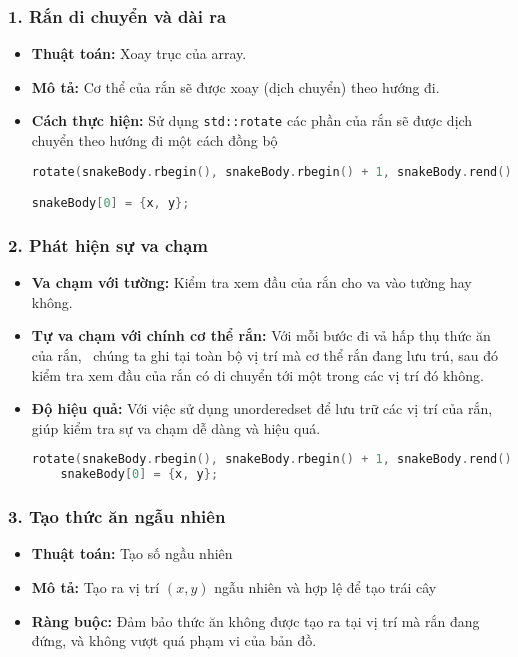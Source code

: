 \documentclass[12pt]{report}
\begin{document}
\subsubsection*{1. Rắn di chuyển và dài ra}
\begin{itemize}
    \item \textbf{Thuật toán:} Xoay trục của array.
    \item \textbf{Mô tả:} Cơ thể của rắn sẽ được xoay (dịch chuyển) theo hướng đi.
    \item \textbf{Cách thực hiện:} Sử dụng \texttt{std::rotate} các phần của rắn sẽ được dịch chuyển theo hướng đi một cách đồng bộ
          \begin{footnotesize}
              \begin{lstlisting}[language=C++]
rotate(snakeBody.rbegin(), snakeBody.rbegin() + 1, snakeBody.rend());

snakeBody[0] = {x, y};
    \end{lstlisting}
          \end{footnotesize}
\end{itemize}

\subsubsection*{2. Phát hiện sự va chạm}
\begin{itemize}
    \item \textbf{Va chạm với tường:} Kiểm tra xem đầu của rắn cho va vào tường hay không.
    \item \textbf{Tự va chạm với chính cơ thể rắn:} Với mỗi bước đi vả hấp thụ thức ăn của rắn, \
          chúng ta ghi tại toàn bộ vị trí mà cơ thể rắn đang lưu trú, sau đó kiểm tra xem đầu của rắn có di chuyển tới một trong các vị trí đó không.
    \item \textbf{Độ hiệu quả:} Với việc sử dụng unorderedset để lưu trữ các vị trí của rắn, giúp kiểm tra sự va chạm dễ dàng và hiệu quá.
          \begin{footnotesize}
              \begin{lstlisting}[language=C++]
    rotate(snakeBody.rbegin(), snakeBody.rbegin() + 1, snakeBody.rend());
    snakeBody[0] = {x, y};
  \end{lstlisting}
          \end{footnotesize}
\end{itemize}

\subsubsection*{3. Tạo thức ăn ngẫu nhiên}
\begin{itemize}
    \item \textbf{Thuật toán:} Tạo số ngầu nhiên
    \item \textbf{Mô tả:} Tạo ra vị trí $(x, y)$ ngẫu nhiên và hợp lệ để tạo trái cây
    \item \textbf{Ràng buộc:} Đảm bảo thức ăn không được tạo ra tại vị trí mà rắn đang đứng, và không vượt quá phạm vi của bản đồ.
\end{itemize}
\end{document}
